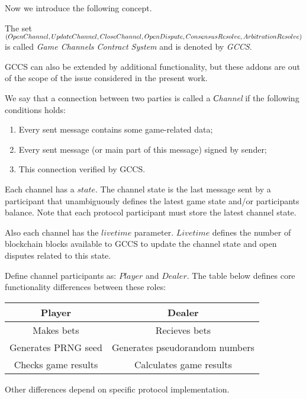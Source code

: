Now we introduce the following concept. 
\begin{defn}
The set $ (OpenChannel, UpdateChannel, CloseChannel,\\ OpenDispute,  ConsensusResolve, ArbitrationResolve) $
is called \textit {Game Channels Contract System} and is denoted by \textit {GCCS}. 
\end{defn}

\begin{remark}
GCCS can also be extended by additional functionality, but these addons are out of the scope of the issue considered in the present work. 
\end{remark}

\begin{defn}
We say that a connection between two parties is called a \textit {Сhannel} if the following conditions holds:
	\begin{enumerate}
		\item Every sent message contains some game-related data;
		\item Every sent message (or main part of this message) signed by sender;
		\item This connection verified by GCCS. 
	\end{enumerate}
\end{defn}

Each channel has a $state$. The channel state is the last message sent by a participant that unambiguously defines the latest game state and/or participants balance. Note that each protocol participant must store the latest channel state. 

Also each channel has the  $livetime$ parameter. $Livetime$ defines the number of blockchain blocks available to GCCS to update the channel state and open disputes related to this state. 

Define channel participants as: $ Player $ and $Dealer$. The table below defines core functionality differences between these roles:
\begin{center}
\begin{tabular}{ |c|c| } 
 \hline
 \textbf{Player} & \textbf{Dealer} \\ 
 \hline
 Makes bets & Recieves bets \\ 
 Generates PRNG seed & Generates pseudorandom numbers \\ 
 Checks game results & Calculates game results\\
 \hline
\end{tabular}
\end{center}
Other differences depend on specific protocol implementation.

